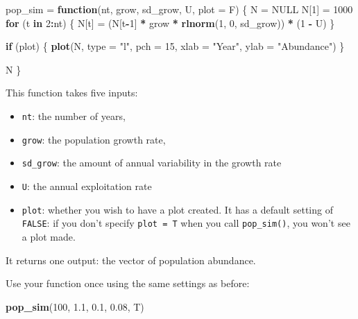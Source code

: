 \documentclass[]{book}
\newenvironment{Shaded}{\begin{snugshade}}{\end{snugshade}}
\newcommand{\KeywordTok}[1]{\textcolor[rgb]{0.13,0.29,0.53}{\textbf{#1}}}
\newcommand{\DataTypeTok}[1]{\textcolor[rgb]{0.13,0.29,0.53}{#1}}
\newcommand{\DecValTok}[1]{\textcolor[rgb]{0.00,0.00,0.81}{#1}}
\newcommand{\FloatTok}[1]{\textcolor[rgb]{0.00,0.00,0.81}{#1}}
\newcommand{\StringTok}[1]{\textcolor[rgb]{0.31,0.60,0.02}{#1}}
\newcommand{\OtherTok}[1]{\textcolor[rgb]{0.56,0.35,0.01}{#1}}
\newcommand{\ControlFlowTok}[1]{\textcolor[rgb]{0.13,0.29,0.53}{\textbf{#1}}}
\newcommand{\OperatorTok}[1]{\textcolor[rgb]{0.81,0.36,0.00}{\textbf{#1}}}
\newcommand{\NormalTok}[1]{#1}
\providecommand{\tightlist}{%
  \setlength{\itemsep}{0pt}\setlength{\parskip}{0pt}}
\theoremstyle{definition}
\theoremstyle{definition}
\theoremstyle{definition}
\theoremstyle{remark}
\begin{document}
\begin{Shaded}
\begin{Highlighting}[]
\NormalTok{pop_sim =}\StringTok{ }\ControlFlowTok{function}\NormalTok{(nt, grow, sd_grow, U, }\DataTypeTok{plot =}\NormalTok{ F) \{}
\NormalTok{  N =}\StringTok{ }\OtherTok{NULL} 
\NormalTok{  N[}\DecValTok{1}\NormalTok{] =}\StringTok{ }\DecValTok{1000}
  \ControlFlowTok{for}\NormalTok{ (t }\ControlFlowTok{in} \DecValTok{2}\OperatorTok{:}\NormalTok{nt) \{}
\NormalTok{    N[t] =}\StringTok{ }\NormalTok{(N[t}\OperatorTok{-}\DecValTok{1}\NormalTok{] }\OperatorTok{*}\StringTok{ }\NormalTok{grow }\OperatorTok{*}\StringTok{ }\KeywordTok{rlnorm}\NormalTok{(}\DecValTok{1}\NormalTok{, }\DecValTok{0}\NormalTok{, sd_grow)) }\OperatorTok{*}\StringTok{ }\NormalTok{(}\DecValTok{1} \OperatorTok{-}\StringTok{ }\NormalTok{U)}
\NormalTok{  \}}
  
  \ControlFlowTok{if}\NormalTok{ (plot) \{}
    \KeywordTok{plot}\NormalTok{(N, }\DataTypeTok{type =} \StringTok{"l"}\NormalTok{, }\DataTypeTok{pch =} \DecValTok{15}\NormalTok{, }\DataTypeTok{xlab =} \StringTok{"Year"}\NormalTok{, }\DataTypeTok{ylab =} \StringTok{"Abundance"}\NormalTok{)}
\NormalTok{  \}}
  
\NormalTok{  N}
\NormalTok{\}}
\end{Highlighting}
\end{Shaded}

This function takes five inputs:

\begin{itemize}
\tightlist
\item
  \texttt{nt}: the number of years,
\item
  \texttt{grow}: the population growth rate,
\item
  \texttt{sd\_grow}: the amount of annual variability in the growth rate
\item
  \texttt{U}: the annual exploitation rate
\item
  \texttt{plot}: whether you wish to have a plot created. It has a
  default setting of \texttt{FALSE}: if you don't specify
  \texttt{plot\ =\ T} when you call \texttt{pop\_sim()}, you won't see a
  plot made.
\end{itemize}

It returns one output: the vector of population abundance.

Use your function once using the same settings as before:

\begin{Shaded}
\begin{Highlighting}[]
\KeywordTok{pop_sim}\NormalTok{(}\DecValTok{100}\NormalTok{, }\FloatTok{1.1}\NormalTok{, }\FloatTok{0.1}\NormalTok{, }\FloatTok{0.08}\NormalTok{, T)}
\end{Highlighting}
\end{Shaded}
\end{document}
